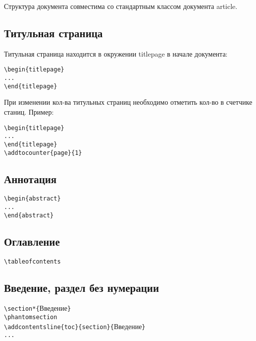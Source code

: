 \documentclass[14pt, a4paper, titlepage]{extarticle}
\renewenvironment{abstract}{\clearpage\section*{\MakeUppercase{\abstractname}}}{\clearpage}
\renewcommand{\thesection}{\Asbuk{section}}
\let\oldsec\section
\renewcommand{\section}{
        \clearpage
        \phantomsection
        \refstepcounter{section}
        \addcontentsline{toc}{section}{\appendixname~\thesection}
        \oldsec*} %
\begin{document}
Структура документа совместима со стандартным классом документа article.

\subsection{Титульная страница}

Титульная страница находится в окружении titlepage в начале документа:
\begin{verbatim}
\begin{titlepage}
...
\end{titlepage}
\end{verbatim}

При изменении кол-ва титульных страниц необходимо отметить кол-во в счетчике станиц. Пример:
\begin{verbatim}
\begin{titlepage}
...
\end{titlepage}
\addtocounter{page}{1}
\end{verbatim}

\subsection{Аннотация}

\begin{verbatim}
\begin{abstract}
...
\end{abstract}
\end{verbatim}

\subsection{Оглавление}

\begin{verbatim}
\tableofcontents
\end{verbatim}

\subsection{Введение, раздел без нумерации}

\noindent\verb"\section*{"Введение\verb"}"\\
\verb"\phantomsection"\\
\verb"\addcontentsline{toc}{section}{"Введение\verb"}"\\
\verb"..."
\end{document}
